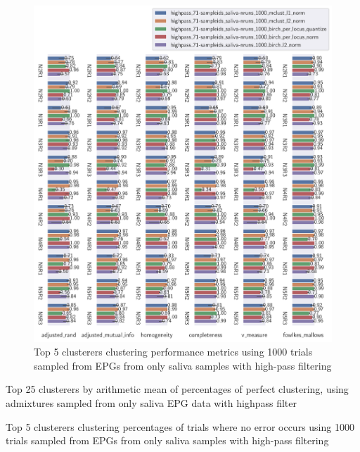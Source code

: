 \begin{theappendices}
\begin{figure}[H]
\centering
\includegraphics[width=\textwidth]{./figures/clust_comparison/highpass_71-sampleids_saliva-nruns_1000_top_5_clusterers_by_metrics.pdf}
\caption{Top 5 clusterers clustering performance metrics using 1000 trials sampled from EPGs from only saliva samples with high-pass filtering}
\label{fig:highpass_71-sampleids_saliva-nruns_1000_top_5_clusterers_by_metrics}
\end{figure}

\begin{table}[H]
\centering
{}
\caption{Top 25 clusterers by arithmetic mean of percentages of perfect clustering, using admixtures sampled from only saliva EPG data with highpass filter}
\label{table:top_25_not_ensemble_clusterers_by_binomial_confidence_highpass_71-sampleids_saliva-nruns_1000}
\end{table}

\begin{table}[H]
\centering
{}
\caption{Top 5 clusterers clustering percentages of trials where no error occurs using 1000 trials sampled from EPGs from only saliva samples with high-pass filtering}
\label{table:highpass_71-sampleids_saliva-nruns_1000_top_5_clusterers_by_binomial_confidence}
\end{table}


\end{theappendices}
